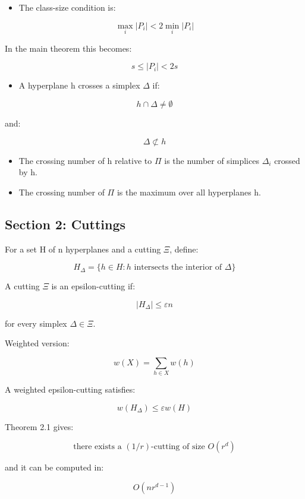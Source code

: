 \documentclass[
  11pt,
]{article}
\providecommand{\tightlist}{%
  \setlength{\itemsep}{0pt}\setlength{\parskip}{0pt}}
\begin{document}
\begin{itemize}
\tightlist
\item
  The class-size condition is:
\end{itemize}

\[
\max_i |P_i| < 2\min_i |P_i|
\]

In the main theorem this becomes:

\[
s\le |P_i|<2s
\]

\begin{itemize}
\tightlist
\item
  A hyperplane h crosses a simplex \(\Delta\) if:
\end{itemize}

\[
h\cap \Delta\ne\emptyset
\]

and:

\[
\Delta\not\subset h
\]

\begin{itemize}
\tightlist
\item
  The crossing number of h relative to \(\Pi\) is the number of
  simplices \(\Delta_i\) crossed by h.
\item
  The crossing number of \(\Pi\) is the maximum over all hyperplanes h.
\end{itemize}

\hypertarget{section-2-cuttings}{%
\subsection{Section 2: Cuttings}\label{section-2-cuttings}}

For a set H of n hyperplanes and a cutting \(\Xi\), define:

\[
H_\Delta=\lbrace h\in H:h\text{ intersects the interior of }\Delta \rbrace
\]

A cutting \(\Xi\) is an epsilon-cutting if:

\[
|H_\Delta|\le \varepsilon n
\]

for every simplex \(\Delta\in\Xi\).

Weighted version:

\[
w(X)=\sum_{h\in X}w(h)
\]

A weighted epsilon-cutting satisfies:

\[
w(H_\Delta)\le \varepsilon w(H)
\]

Theorem 2.1 gives:

\[
\text{there exists a }(1/r)\text{-cutting of size }O(r^d)
\]

and it can be computed in:

\[
O(nr^{d-1})
\]
\end{document}
